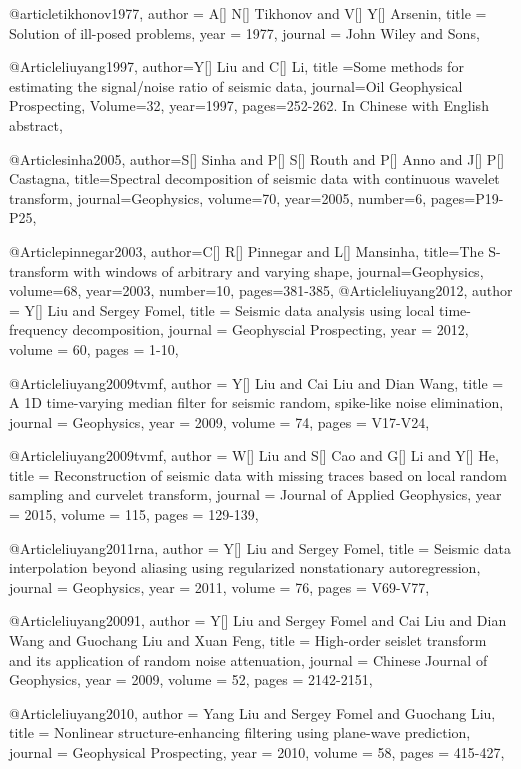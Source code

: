 @article{tikhonov1977,
  author =	 {A[] N[] Tikhonov and V[] Y[] Arsenin},
  title =	 {Solution of ill-posed problems},
  year =	 1977,
  journal =	 {John Wiley and Sons},
}

@Article{liuyang1997,
  author={Y[] Liu and C[] Li},
  title ={Some methods for estimating the signal/noise ratio of seismic data},
  journal={Oil Geophysical Prospecting},
  Volume=32,
  year=1997,
  pages={252-262. In Chinese with English abstract},
}

@Article{sinha2005,
author={S[] Sinha and P[] S[] Routh and P[] Anno and J[] P[] Castagna},
title={Spectral decomposition of seismic data with continuous wavelet transform},
journal={Geophysics},
volume=70,
year=2005,
number=6,
pages={P19-P25},
}

@Article{pinnegar2003,
author={C[] R[] Pinnegar and L[] Mansinha},
title={The S-transform with windows of arbitrary and varying shape},
journal={Geophysics},
volume=68,
year=2003,
number=10,
pages={381-385},
}
@Article{liuyang2012,
  author = 	 {Y[] Liu and Sergey Fomel},
  title = 	 {Seismic data analysis using local time-frequency decomposition},
  journal = 	 {Geophyscial Prospecting},
  year = 	 2012,
  volume =	 60,
  pages =	 {1-10},
}

@Article{liuyang2009tvmf,
  author = 	 {Y[] Liu and Cai Liu and Dian Wang},
  title = 	 {A 1D time-varying median filter for seismic random, spike-like noise elimination},
  journal = 	 {Geophysics},
  year = 	 2009,
  volume =	 74,
  pages =	 {V17-V24},
}

@Article{liuyang2009tvmf,
  author = 	 {W[] Liu and S[] Cao and G[] Li and Y[] He},
  title = 	 {Reconstruction of seismic data with missing traces based on local random sampling and curvelet transform},
  journal = 	 {Journal of Applied Geophysics},
  year = 	 2015,
  volume = 115,
  pages =	 {129-139},
}

@Article{liuyang2011rna,
  author = 	 {Y[] Liu and Sergey Fomel},
  title = 	 {Seismic data interpolation beyond aliasing using regularized nonstationary autoregression},
  journal = 	 {Geophysics},
  year = 	 2011,
  volume =	 76,
  pages =	 {V69-V77},
}

@Article{liuyang20091,
  author = 	 {Y[] Liu and Sergey Fomel and Cai Liu and Dian Wang and Guochang Liu and Xuan Feng},
  title = 	 {High-order seislet transform and its application of random noise attenuation},
  journal = 	 {Chinese Journal of Geophysics},
  year = 	 2009,
  volume =	 52,
  pages =	 {2142-2151},
}

@Article{liuyang2010,
  author = 	 {Yang Liu and Sergey Fomel and Guochang Liu},
  title = 	 {Nonlinear structure-enhancing filtering using plane-wave prediction},
  journal = 	 {Geophysical Prospecting},
  year = 	 2010,
  volume =	 58,
  pages =	 {415-427},
}

